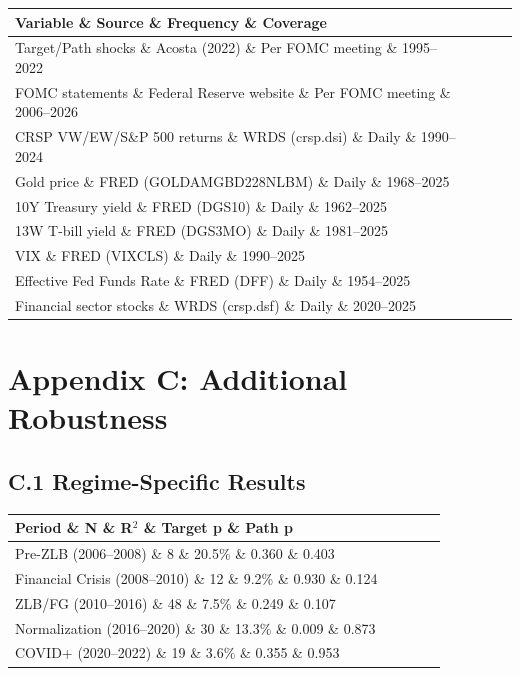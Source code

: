 \begin{table}[htbp]
\centering
\begin{tabular}{lccc}
\toprule
Variable \& Source \& Frequency \& Coverage \\
\midrule
Target/Path shocks \& Acosta (2022) \& Per FOMC meeting \& 1995--2022 \\
FOMC statements \& Federal Reserve website \& Per FOMC meeting \& 2006--2026 \\
CRSP VW/EW/S\&P 500 returns \& WRDS (crsp.dsi) \& Daily \& 1990--2024 \\
Gold price \& FRED (GOLDAMGBD228NLBM) \& Daily \& 1968--2025 \\
10Y Treasury yield \& FRED (DGS10) \& Daily \& 1962--2025 \\
13W T-bill yield \& FRED (DGS3MO) \& Daily \& 1981--2025 \\
VIX \& FRED (VIXCLS) \& Daily \& 1990--2025 \\
Effective Fed Funds Rate \& FRED (DFF) \& Daily \& 1954--2025 \\
Financial sector stocks \& WRDS (crsp.dsf) \& Daily \& 2020--2025 \\
\bottomrule
\end{tabular}
\end{table}


\section{Appendix C: Additional Robustness}

\subsection{C.1 Regime-Specific Results}

\begin{table}[htbp]
\centering
\begin{tabular}{lcccc}
\toprule
Period \& N \& R$^2$ \& Target p \& Path p \\
\midrule
Pre-ZLB (2006--2008) \& 8 \& 20.5\% \& 0.360 \& 0.403 \\
Financial Crisis (2008--2010) \& 12 \& 9.2\% \& 0.930 \& 0.124 \\
ZLB/FG (2010--2016) \& 48 \& 7.5\% \& 0.249 \& 0.107 \\
Normalization (2016--2020) \& 30 \& 13.3\% \& 0.009 \& 0.873 \\
COVID+ (2020--2022) \& 19 \& 3.6\% \& 0.355 \& 0.953 \\
\bottomrule
\end{tabular}
\end{table}

